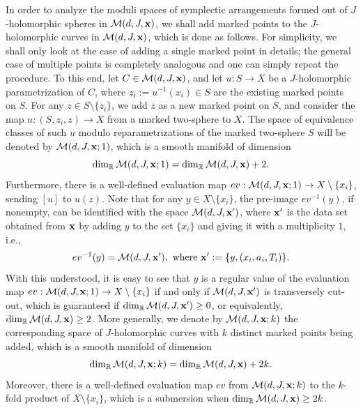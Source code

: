 \documentclass[11pt]{amsart}
\theoremstyle{plain}
\numberwithin{theorem}{section}
\theoremstyle{definition}
\newcommand{\R}{{\mathbb R}}
\newcommand{\M}{{\mathcal M}}
\begin{document}
In order to analyze the moduli spaces of symplectic arrangements formed out of $J$-holomorphic spheres in
$\M(d,J, {\bf x})$, we shall add marked points to the $J$-holomorphic curves in $\M(d,J, {\bf x})$, which is done as follows. For simplicity, we shall only look at the case of adding a single marked point in details; the general case of multiple points is completely analogous and one can simply repeat the procedure. To this end, let 
$C\in \M(d,J, {\bf x})$, and let $u:S\rightarrow X$ be a $J$-holomorphic parametrization of $C$, where 
$z_i:=u^{-1}(x_i)\in S$ are the existing marked points on $S$. For any $z\in S\setminus \{z_i\}$, we add $z$ 
as a new marked point on $S$, and consider the map $u: (S,z_i,z)\rightarrow X$ from a marked two-sphere to $X$. The space of equivalence classes of such $u$ modulo reparametrizations of the marked two-sphere $S$ will be denoted by $\M(d,J, {\bf x}; 1)$, which is a smooth manifold of dimension 
$$
\dim_\R \M(d,J, {\bf x}; 1)=\dim_\R \M(d,J, {\bf x})+2.
$$ 
Furthermore, there is a well-defined 
evaluation map $ev: \M(d,J, {\bf x}; 1)\rightarrow X\setminus \{x_i\}$, sending $[u]$ to $u(z)$. Note that
for any $y\in X\setminus \{x_i\}$, the pre-image $ev^{-1}(y)$, if nonempty, can be identified with the
space $\M(d,J, {\bf x}^\prime)$, where ${\bf x}^\prime$ is the data set obtained from ${\bf x}$ by
adding $y$ to the set $\{x_i\}$ and giving it with a multiplicity $1$, i.e., 
$$
ev^{-1}(y)= \M(d,J, {\bf x}^\prime), \mbox{ where } {\bf x}^\prime:=\{y, (x_i,a_i,T_i)\}. 
$$
With this understood, it is easy to see that $y$ is a regular value of the evaluation map 
$ev: \M(d,J, {\bf x}; 1)\rightarrow X\setminus \{x_i\}$
if and only if $\M(d,J, {\bf x}^\prime)$ is transversely cut-out, which is guaranteed if 
$\dim_\R \M(d,J, {\bf x}^\prime)\geq 0$, or equivalently, $\dim_\R \M(d,J, {\bf x})\geq 2$. 
More generally, we denote by $\M(d,J, {\bf x}; k)$ the corresponding space of 
$J$-holomorphic curves with $k$ distinct marked points being added, which is a smooth manifold of dimension 
$$
\dim_\R \M(d,J, {\bf x}; k)=\dim_\R \M(d,J, {\bf x})+2k.
$$
Moreover, there is a well-defined evaluation map $ev$ from $\M(d,J, {\bf x}; k)$ to the $k$-fold product of $X\setminus \{x_i\}$, which is a submersion when $\dim_\R \M(d,J, {\bf x})\geq 2k$. 
\end{document}
